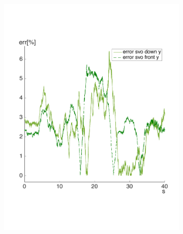 \begin{figure}[!htbp]
\begin{subfigure}[b]{0.3\textwidth}
        \includegraphics[width=\textwidth]{img/err_perc_2_svo_y.pdf}
        \label{fig:perc_errortwo}
   \end{subfigure}\hfill
   \begin{subfigure}[b]{0.3\textwidth}

\end{subfigure}
\end{figure}

